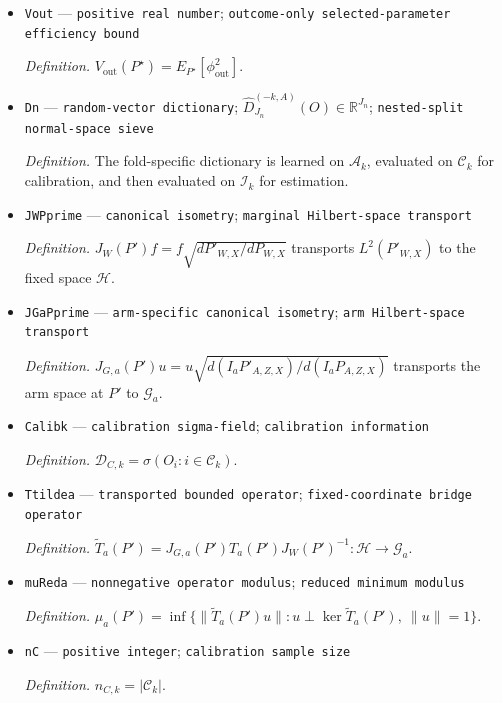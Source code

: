 \documentclass{article}
\begin{document}
\begin{itemize}
  \item \texttt{Vout} --- \texttt{positive real number}; \texttt{outcome-\allowbreak{}only selected-\allowbreak{}parameter efficiency bound}
  \par\smallskip\noindent\emph{Definition.} \(V_{\mathrm{out}}(P^\star)=E_{P^\star}[\phi_{\mathrm{out}}^2]\).
  \item \texttt{Dn} --- \texttt{random-\allowbreak{}vector dictionary}; \(\widehat D_{J_n}^{(-k,A)}(O)\in\mathbb R^{J_n}\); \texttt{nested-\allowbreak{}split normal-\allowbreak{}space sieve}
  \par\smallskip\noindent\emph{Definition.} The fold-specific dictionary is learned on \(\mathcal A_k\), evaluated on \(\mathcal C_k\) for calibration, and then evaluated on \(\mathcal I_k\) for estimation.
  \item \texttt{JWPprime} --- \texttt{canonical isometry}; \texttt{marginal Hilbert-\allowbreak{}space transport}
  \par\smallskip\noindent\emph{Definition.} \(J_W(P')f=f\sqrt{dP'_{W,X}/dP_{W,X}}\) transports \(L^2(P'_{W,X})\) to the fixed space \(\mathcal H\).
  \item \texttt{JGaPprime} --- \texttt{arm-\allowbreak{}specific canonical isometry}; \texttt{arm Hilbert-\allowbreak{}space transport}
  \par\smallskip\noindent\emph{Definition.} \(J_{G,a}(P')u=u\sqrt{d(I_aP'_{A,Z,X})/d(I_aP_{A,Z,X})}\) transports the arm space at \(P'\) to \(\mathcal G_a\).
  \item \texttt{Calibk} --- \texttt{calibration sigma-\allowbreak{}field}; \texttt{calibration information}
  \par\smallskip\noindent\emph{Definition.} \(\mathcal D_{C,k}=\sigma(O_i:i\in\mathcal C_k)\).
  \item \texttt{Ttildea} --- \texttt{transported bounded operator}; \texttt{fixed-\allowbreak{}coordinate bridge operator}
  \par\smallskip\noindent\emph{Definition.} \(\widetilde T_a(P')=J_{G,a}(P')T_a(P')J_W(P')^{-1}:\mathcal H\to\mathcal G_a\).
  \item \texttt{muReda} --- \texttt{nonnegative operator modulus}; \texttt{reduced minimum modulus}
  \par\smallskip\noindent\emph{Definition.} \(\mu_a(P')=\inf\{\|\widetilde T_a(P')u\|:u\perp\ker\widetilde T_a(P'),\ \|u\|=1\}\).
  \item \texttt{nC} --- \texttt{positive integer}; \texttt{calibration sample size}
  \par\smallskip\noindent\emph{Definition.} \(n_{C,k}=|\mathcal C_k|\).

\end{itemize}
\end{document}
